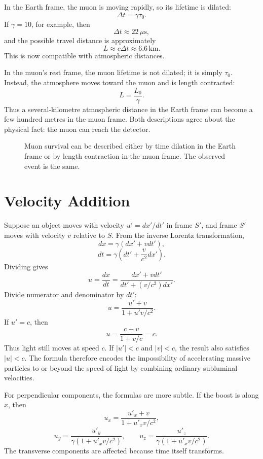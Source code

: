 In the Earth frame, the muon is moving rapidly, so its lifetime is dilated:
\[
\Delta t=\gamma\tau_0.
\]
If \(\gamma=10\), for example, then
\[
\Delta t\approx 22\,\mu\mathrm{s},
\]
and the possible travel distance is approximately
\[
L\approx c\Delta t\approx 6.6\,\mathrm{km}.
\]
This is now compatible with atmospheric distances.

In the muon's rest frame, the muon lifetime is not dilated; it is simply
\(\tau_0\). Instead, the atmosphere moves toward the muon and is length
contracted:
\[
L=\frac{L_0}{\gamma}.
\]
Thus a several-kilometre atmospheric distance in the Earth frame can become a
few hundred metres in the muon frame. Both descriptions agree about the physical
fact: the muon can reach the detector.

\begin{figure}[h]
\centering

\caption{Muon survival can be described either by time dilation in the Earth
frame or by length contraction in the muon frame. The observed event is the same.}
\end{figure}

\clearpage

\section{Velocity Addition}

Suppose an object moves with velocity \(u'=dx'/dt'\) in frame \(S'\), and frame
\(S'\) moves with velocity \(v\) relative to \(S\). From the inverse Lorentz
transformation,
\[
dx=\gamma(dx'+vdt'),
\]
\[
dt=\gamma\left(dt'+\frac{v}{c^2}dx'\right).
\]
Dividing gives
\[
u=\frac{dx}{dt}
=\frac{dx'+vdt'}{dt'+(v/c^2)dx'}.
\]
Divide numerator and denominator by \(dt'\):
\[
\boxed{u=\frac{u'+v}{1+u'v/c^2}.}
\]
If \(u'=c\), then
\[
u=\frac{c+v}{1+v/c}=c.
\]
Thus light still moves at speed \(c\). If \(|u'|<c\) and \(|v|<c\), the result
also satisfies \(|u|<c\). The formula therefore encodes the impossibility of
accelerating massive particles to or beyond the speed of light by combining
ordinary subluminal velocities.

For perpendicular components, the formulas are more subtle. If the boost is
along \(x\), then
\[
u_x=\frac{u'_x+v}{1+u'_xv/c^2},
\]
\[
u_y=\frac{u'_y}{\gamma(1+u'_xv/c^2)},
\qquad
u_z=\frac{u'_z}{\gamma(1+u'_xv/c^2)}.
\]
The transverse components are affected because time itself transforms.

\clearpage

